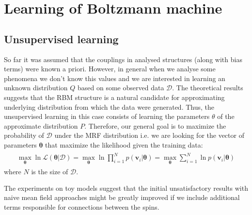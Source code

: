 \chapter{Learning of Boltzmann machine}
\section{Unsupervised learning}
So far it was assumed that the couplings in analysed structures (along with bias terms) were known a priori. However, in general when we analyse some phenomena we don't know this values and we are interested in learning an unknown distribution $Q$ based on some observed data $\mathcal{D}$. The theoretical results suggests that the RBM structure is a natural candidate for approximating underlying distribution from which the data were generated. Thus, the unsupervised learning in this case consists of learning the parameters $\theta$ of the approximate distribution $P$. Therefore, our general goal is to maximize the probability of $\mathcal{D}$ under the MRF distribution i.e. we are looking for the vector of parameters $\mathbf{\theta}$ that maximize the likelihood given the training data:
\begin{align}
\begin{split}
\max_{\mathbf{\theta}} \ln \mathcal{L}(\mathbf{\theta}| \mathcal{D}) = \max_{\mathbf{\theta}}  \ln \prod_{i=1}^N p(\mathbf{v}_i |\mathbf{\theta}) = \max_{\mathbf{\theta}} \sum_{i=1}^N \ln p(\mathbf{v}_i |\mathbf{\theta} )
\end{split}
\end{align}
where $N$ is the size of $\mathcal{D}$. 

The experiments on toy models suggest that the initial unsatisfactory results with naive mean field approaches \cite{tieleman2008training} might be greatly improved if we include additional terms responsible for connections between the spins.

